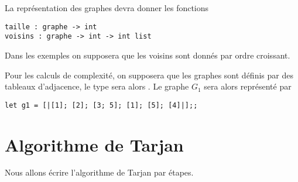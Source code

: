 {\medskip

La représentation des graphes devra donner les fonctions

\begin{lstlisting}
taille : graphe -> int 
voisins : graphe -> int -> int list 
\end{lstlisting}

Dans les exemples on supposera que les voisins sont donnés par ordre croissant.

\medskip

Pour les calculs de complexité, on supposera que les graphes sont définis par des tableaux d'adjacence, le type  sera alors . 
Le graphe $G_1$ sera alors représenté par 
\begin{lstlisting}
let g1 = [|[1]; [2]; [3; 5]; [1]; [5]; [4]|];;
\end{lstlisting}
}
\section{Algorithme de Tarjan} 
Nous allons écrire l'algorithme de Tarjan par étapes.

